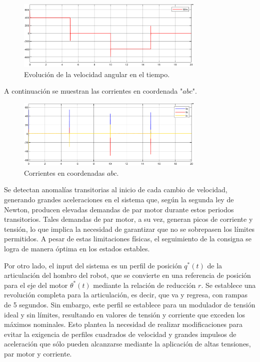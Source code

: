 \documentclass{article}
\begin{document}
\begin{figure}[H]
    \centering
    \includegraphics[width=0.8\textwidth]{5.2.4.a.4.png}
    \caption{Evolución de la velocidad angular en el tiempo.}
\end{figure}

A continuación se muestran las corrientes en coordenada "$abc$".

\begin{figure}[H]
    \centering
    \includegraphics[width=0.8\textwidth]{5.2.4.a.6.png}
    \caption{Corrientes en coordenadas $abc$.}
\end{figure}

Se detectan anomalías transitorias al inicio de cada cambio de velocidad, generando grandes 
aceleraciones en el sistema que, según la segunda ley de Newton, producen elevadas demandas de 
par motor durante estos periodos transitorios. Tales demandas de par motor, a su vez, generan 
picos de corriente y tensión, lo que implica la necesidad de garantizar que no se sobrepasen los 
límites permitidos. A pesar de estas limitaciones físicas, el seguimiento de la consigna se logra 
de manera óptima en los estados estables.

Por otro lado, el input del sistema es un perfil de posición $q^*(t)$ de la articulación del hombro 
del robot, que se convierte en una referencia de posición para el eje del motor $θ^*(t)$ mediante la 
relación de reducción $r$. Se establece una revolución completa para la articulación, es decir, que 
va y regresa, con rampas de 5 segundos. Sin embargo, este perfil se establece para un modulador de 
tensión ideal y sin límites, resultando en valores de tensión y corriente que exceden los máximos 
nominales. Esto plantea la necesidad de realizar modificaciones para evitar la exigencia de perfiles 
cuadrados de velocidad y grandes impulsos de aceleración que sólo pueden alcanzarse mediante la 
aplicación de altas tensiones, par motor y corriente.
\end{document}
